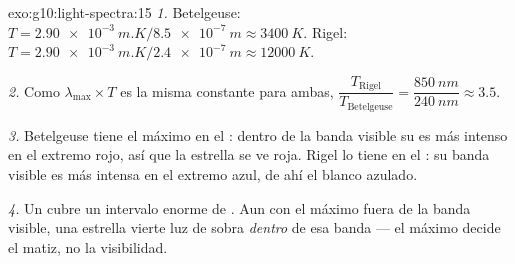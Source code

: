 \begin{solution}{exo:g10:light-spectra:15}
\emph{1.} Betelgeuse:
$T = \qty{2.90e-3}{m.K} / \qty{8.5e-7}{m} \approx \qty{3400}{K}$. Rigel:
$T = \qty{2.90e-3}{m.K} / \qty{2.4e-7}{m} \approx \qty{12000}{K}$.

\emph{2.} Como $\lambda_{\max} \times T$ es la misma constante para
ambas,
$\dfrac{T_{\text{Rigel}}}{T_{\text{Betelgeuse}}}
= \dfrac{\qty{850}{nm}}{\qty{240}{nm}} \approx 3.5$.

\emph{3.} Betelgeuse tiene el máximo en el : dentro de la
banda visible su  es más intenso en el extremo rojo, así que la
estrella se ve roja. Rigel lo tiene en el : su banda visible
es más intensa en el extremo azul, de ahí el blanco azulado.

\emph{4.} Un  cubre un intervalo enorme de . Aun con el máximo fuera de la banda visible, una estrella
vierte luz de sobra \emph{dentro} de esa banda --- el máximo decide el
matiz, no la visibilidad.
\end{solution}


